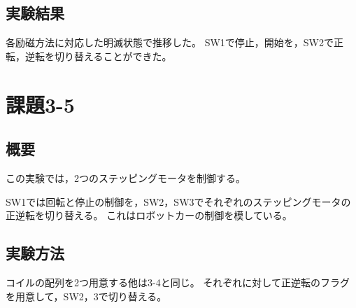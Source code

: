 \documentclass[a4paper,10pt]{jsarticle}
\begin{document}
\subsection{実験結果}
各励磁方法に対応した明滅状態で推移した。
SW1で停止，開始を，SW2で正転，逆転を切り替えることができた。

\section{課題3-5}
\subsection{概要}
この実験では，2つのステッピングモータを制御する。

SW1では回転と停止の制御を，SW2，SW3でそれぞれのステッピングモータの正逆転を切り替える。
これはロボットカーの制御を模している。

\subsection{実験方法}
コイルの配列を2つ用意する他は3-4と同じ。
それぞれに対して正逆転のフラグを用意して，SW2，3で切り替える。
\end{document}

